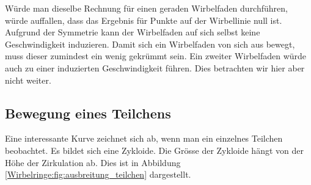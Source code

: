 Würde man dieselbe Rechnung für einen geraden Wirbelfaden durchführen, würde auffallen, dass das Ergebnis für Punkte auf der Wirbellinie null ist.
Aufgrund der Symmetrie kann der Wirbelfaden auf sich selbst keine Geschwindigkeit induzieren.
Damit sich ein Wirbelfaden von sich aus bewegt, muss dieser zumindest ein wenig gekrümmt sein.
Ein zweiter Wirbelfaden würde auch zu einer induzierten Geschwindigkeit führen. 
Dies betrachten wir hier aber nicht weiter. 

\subsection{Bewegung eines Teilchens}



Eine interessante Kurve zeichnet sich ab, wenn man ein einzelnes Teilchen beobachtet.
Es bildet sich eine Zykloide.
Die Grösse der Zykloide hängt von der Höhe der Zirkulation ab.
Dies ist in Abbildung \ref{Wirbelringe:fig:ausbreitung_teilchen} dargestellt.
